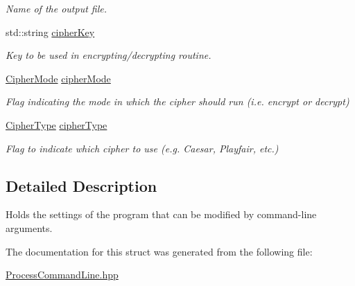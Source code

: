 \begin{DoxyCompactItemize}
\begin{DoxyCompactList}\small\item\em Name of the output file. \end{DoxyCompactList}\item 
std\+::string \hyperlink{struct_program_settings_a7cd3d165c25f89a7a0ad5224309f4d49}{cipher\+Key}\hypertarget{struct_program_settings_a7cd3d165c25f89a7a0ad5224309f4d49}{}\label{struct_program_settings_a7cd3d165c25f89a7a0ad5224309f4d49}

\begin{DoxyCompactList}\small\item\em Key to be used in encrypting/decrypting routine. \end{DoxyCompactList}\item 
\hyperlink{_cipher_mode_8hpp_ac3adaabf9bad553901589ddf3de6daf5}{Cipher\+Mode} \hyperlink{struct_program_settings_a4c9d4e90e44af4698ded0be678b6fd46}{cipher\+Mode}\hypertarget{struct_program_settings_a4c9d4e90e44af4698ded0be678b6fd46}{}\label{struct_program_settings_a4c9d4e90e44af4698ded0be678b6fd46}

\begin{DoxyCompactList}\small\item\em Flag indicating the mode in which the cipher should run (i.\+e. encrypt or decrypt) \end{DoxyCompactList}\item 
\hyperlink{_cipher_type_8hpp_aa1792f73cc3a05b7816d502879582348}{Cipher\+Type} \hyperlink{struct_program_settings_a01a75038fbb1c674e6fc3b6d36bf306e}{cipher\+Type}\hypertarget{struct_program_settings_a01a75038fbb1c674e6fc3b6d36bf306e}{}\label{struct_program_settings_a01a75038fbb1c674e6fc3b6d36bf306e}

\begin{DoxyCompactList}\small\item\em Flag to indicate which cipher to use (e.\+g. Caesar, Playfair, etc.) \end{DoxyCompactList}\end{DoxyCompactItemize}


\subsection{Detailed Description}
Holds the settings of the program that can be modified by command-\/line arguments. 

The documentation for this struct was generated from the following file\+:\begin{DoxyCompactItemize}
\item 
\hyperlink{_process_command_line_8hpp}{Process\+Command\+Line.\+hpp}\end{DoxyCompactItemize}
